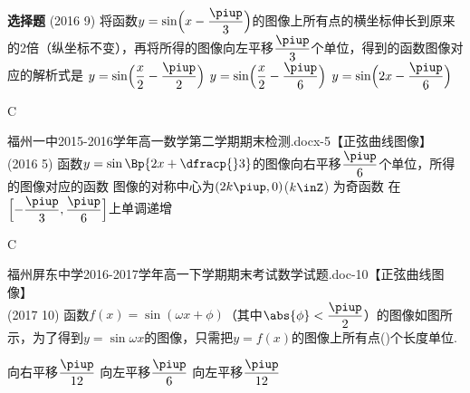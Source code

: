 \begin{exercise}{\bf 选择题}
      (2016  9)
      将函数$y=\sin\Bigl(x-\dfrac{\piup}3\Bigr)$的图像上所有点的横坐标伸长到原来的2倍（纵坐标不变），再将所得的图像向左平移$\dfrac{\piup}3$个单位，得到的函数图像对应的解析式是\xz
        {$y=\sin\Bigl(\dfrac x2-\dfrac{\piup}2\Bigr)$}
        {$y=\sin\Bigl(\dfrac{x}2-\dfrac{\piup}6\Bigr)$}
        {$y=\sin\Bigl(2x-\dfrac{\piup}6\Bigr)$}
      \begin{answer}
        C
      \end{answer}
    \item 福州一中2015-2016学年高一数学第二学期期末检测.docx-5【正弦曲线图像】\\
      (2016  5)
      函数$y=\sin\Bp{2x+\dfracp{}3}$的图像向右平移$\dfrac{\piup}6$个单位，所得的图像对应的函数\xz
       {图像的对称中心为$(2k\piup,0)$($k\inZ$)}
       {为奇函数}
       {在$\Bigl[-\dfrac{\piup}3,\dfrac{\piup}6\Bigr]$上单调递增}
      \begin{answer}
        C
      \end{answer}
    \item 福州屏东中学2016-2017学年高一下学期期末考试数学试题.doc-10【正弦曲线图像】\\
      (2017  10)
      函数$f(x)=\sin(\omega x+\phi)$（其中$\abs{\phi}<\dfrac{\piup}2$）的图像如图所示，为了得到$y=\sin\omega x$的图像，只需把$y=f(x)$的图像上所有点(\hspace{2.5em})个长度单位.\\
      \begin{minipage}[b]{0.8\linewidth}
        \vspace{2.5em}
         {向右平移$\dfrac{\piup}{12}$}
         {向左平移$\dfrac{\piup}6$}
         {向左平移$\dfrac{\piup}{12}$}
      \end{minipage}\hfill
      \begin{minipage}[h]{0.2\linewidth}
        \vspace{-2.7cm}
        \begin{center}
\end{center}
\end{minipage}
\end{exercise}
